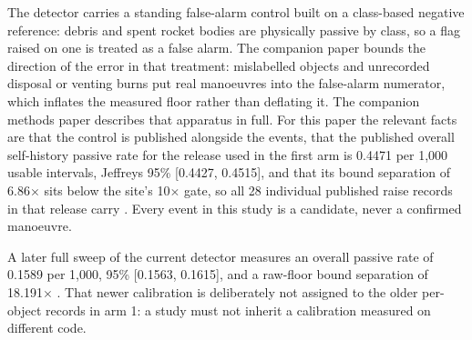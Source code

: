 \documentclass[11pt]{article}
\begin{document}
The detector carries a standing false-alarm control built on a class-based negative reference: debris and spent rocket bodies are physically passive by class, so a flag raised on one is treated as a false alarm. The companion paper bounds the direction of the error in that treatment: mislabelled objects and unrecorded disposal or venting burns put real manoeuvres into the false-alarm numerator, which inflates the measured floor rather than deflating it. The companion methods paper describes that apparatus in full. For this paper the relevant facts are that the control is published alongside the events, that the published overall self-history passive rate for the release used in the first arm is 0.4471 per 1,000 usable intervals, Jeffreys 95\% [0.4427, 0.4515], and that its bound separation of 6.86$\times$ sits below the site's 10$\times$ gate, so all 28 individual published raise records in that release carry %
. Every event in this study is a candidate, never a confirmed manoeuvre.

A later full sweep of the current detector measures an overall passive rate of 0.1589 per 1,000, 95\% [0.1563, 0.1615], and a raw-floor bound separation of 18.191$\times$%
. That newer calibration is deliberately not assigned to the older per-object records in arm 1: a study must not inherit a calibration measured on different code.
\end{document}
